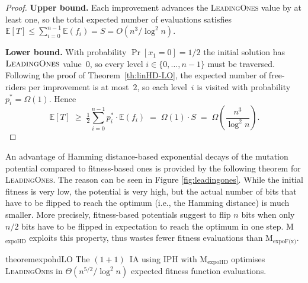 \documentclass[lettersize,journal]{IEEEtran}
\newcommand{\EE}{\mathbb{E}}
\newcommand{\oneoneIA}{$(1+1)$~IA}
\newcommand{\expoF}{M$_{\text{expoF(x)}}$}
\newcommand{\expoHD}{M$_{\text{expoHD}}$}
\newcommand{\IPHfcm}{IPH}
\begin{document}
\begin{proof}
\textbf{Upper bound.}
Each improvement advances the \textsc{LeadingOnes} value by at least one,
so the total expected number of evaluations satisfies
$\EE[T] \le \sum_{i=0}^{n-1} \EE(f_i) = S = O(n^3/\log^2 n)$.

\textbf{Lower bound.}
With probability $\Pr[x_1=0]=1/2$ the initial solution has
$\textsc{LeadingOnes}$ value~$0$, so every level $i\in\{0,\dots,n-1\}$
must be traversed.  Following the proof of Theorem~\ref{th:linHD-LO},
the expected number of free-riders per improvement is at most~$2$,
so each level~$i$ is visited with probability $p_i^*=\Omega(1)$.
Hence
\[
\EE[T]
\;\ge\;
\tfrac{1}{2}\sum_{i=0}^{n-1} p_i^*\cdot \EE(f_i)
\;=\;
\Omega(1)\cdot S
\;=\;
\Omega\!\left(\frac{n^3}{\log^2 n}\right).
\]
\end{proof}

 

An advantage of Hamming distance-based exponential decays of the mutation potential
compared to fitness-based ones is provided by the following theorem for \textsc{LeadingOnes}.
The reason can be seen in Figure \ref{fig:leadingones}.  While the initial fitness is very low, the potential is very high, but the actual number of bits that have to be flipped to reach the optimum (i.e., the Hamming distance) is much smaller. More precisely, fitness-based potentials suggest to flip $n$ bits when only $n/2$ bits have to be flipped in expectation to reach the optimum in one step. 
{\expoHD } exploits this property, thus wastes fewer fitness evaluations than \expoF. 




\begin{restatable}{theorem}{expohdLO}\label{thm:expohdLO}
The {\oneoneIA } using \IPHfcm{} with {\expoHD } optimises
\textsc{LeadingOnes} in $\Theta(n^{5/2}/\log^2 n)$ expected fitness function
evaluations.
\end{restatable}
\end{document}
